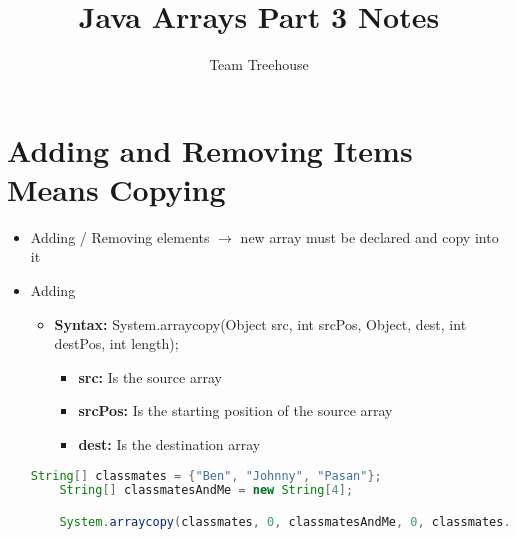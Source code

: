 \documentclass[12pt]{article}
\begin{document}
\title{Java Arrays Part 3 Notes}
\author{Team Treehouse}
\maketitle

\section{Adding and Removing Items Means Copying}

\bigskip

\begin{itemize}
    \item Adding / Removing elements $\to$ new array must be declared and copy into it
    \item Adding
    \begin{itemize}
        \item \textbf{Syntax:} System.arraycopy(Object src, int srcPos, Object, dest, int destPos, int length);
        \begin{itemize}
            \item \textbf{src:} Is the source array
            \item \textbf{srcPos:} Is the starting position of the source array
            \item \textbf{dest:} Is the destination array
        \end{itemize}
    \end{itemize}

    \begin{lstlisting}[language=Java, caption={lesson\_07/Explore.java}]
    String[] classmates = {"Ben", "Johnny", "Pasan"};
    String[] classmatesAndMe = new String[4];

    System.arraycopy(classmates, 0, classmatesAndMe, 0, classmates.length);

    \end{lstlisting}
\end{itemize}
\end{document}
